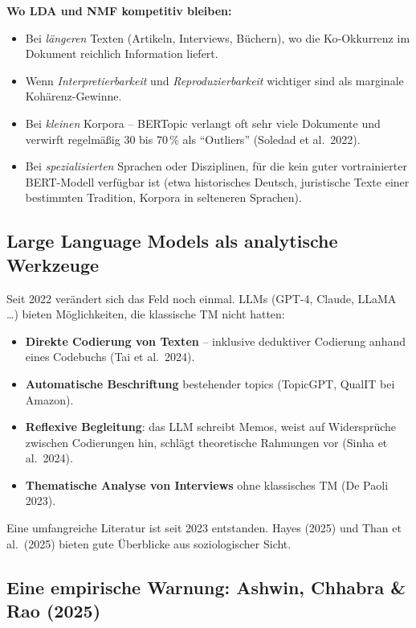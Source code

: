\documentclass[a4paper,11pt]{article}
\begin{document}
\textbf{Wo LDA und NMF kompetitiv bleiben:}

\begin{itemize}
\item Bei \emph{längeren} Texten (Artikeln, Interviews, Büchern),
wo die Ko-Okkurrenz im Dokument reichlich Information liefert.
\item Wenn \emph{Interpretierbarkeit} und \emph{Reproduzierbarkeit}
wichtiger sind als marginale Kohärenz-Gewinne.
\item Bei \emph{kleinen} Korpora -- BERTopic verlangt oft sehr viele
Dokumente und verwirft regelmäßig 30 bis 70\,\% als
\enquote{Outliers} (Soledad et al.\ 2022).
\item Bei \emph{spezialisierten} Sprachen oder Disziplinen, für die
kein guter vortrainierter BERT-Modell verfügbar ist (etwa
historisches Deutsch, juristische Texte einer bestimmten
Tradition, Korpora in selteneren Sprachen).
\end{itemize}

\subsection{Large Language Models als analytische Werkzeuge}

Seit 2022 verändert sich das Feld noch einmal. LLMs (GPT-4, Claude,
LLaMA \dots) bieten Möglichkeiten, die klassische TM nicht hatten:

\begin{itemize}
\item \textbf{Direkte Codierung von Texten} -- inklusive deduktiver
Codierung anhand eines Codebuchs (Tai et al.\ 2024).
\item \textbf{Automatische Beschriftung} bestehender topics
(TopicGPT, QualIT bei Amazon).
\item \textbf{Reflexive Begleitung}: das LLM schreibt Memos, weist
auf Widersprüche zwischen Codierungen hin, schlägt theoretische
Rahmungen vor (Sinha et al.\ 2024).
\item \textbf{Thematische Analyse von Interviews} ohne klassisches
TM (De Paoli 2023).
\end{itemize}

Eine umfangreiche Literatur ist seit 2023 entstanden. Hayes (2025) und
Than et al.\ (2025) bieten gute Überblicke aus soziologischer Sicht.

\subsection{Eine empirische Warnung: Ashwin, Chhabra \& Rao (2025)}
\end{document}
